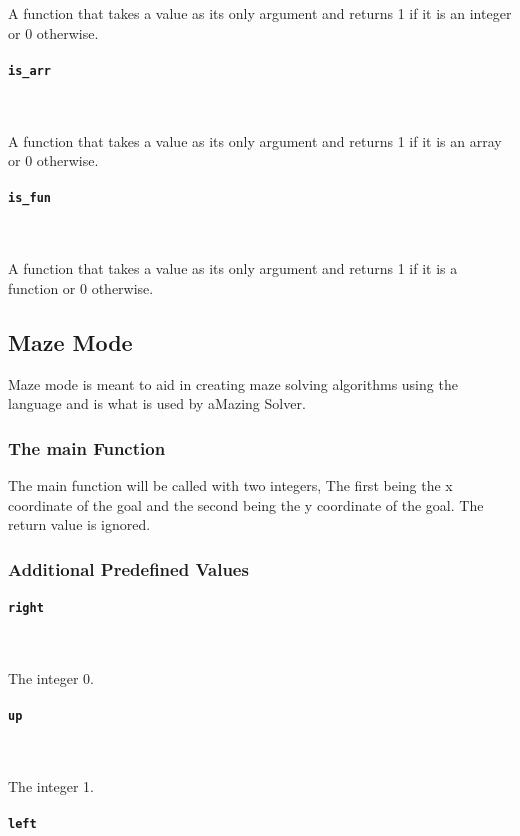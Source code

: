 \documentclass[12pt, a4paper]{article}
\begin{document}
A function that takes a value as its only argument and returns 1 if it is an integer or 0 otherwise.

\paragraph{\texttt{is\_arr}} \

A function that takes a value as its only argument and returns 1 if it is an array or 0 otherwise.

\paragraph{\texttt{is\_fun}} \

A function that takes a value as its only argument and returns 1 if it is a function or 0 otherwise.

\subsection{Maze Mode}

Maze mode is meant to aid in creating maze solving algorithms using the language and is what is used by aMazing Solver.

\subsubsection{The main Function}

The main function will be called with two integers, The first being the x coordinate of the goal and the second being the y coordinate of the goal. The return value is ignored.

\subsubsection{Additional Predefined Values}

\paragraph{\texttt{right}} \

The integer 0.

\paragraph{\texttt{up}} \

The integer 1.

\paragraph{\texttt{left}} \
\end{document}
